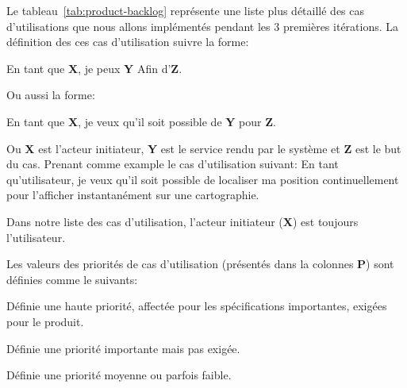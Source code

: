

Le tableau~\ref{tab:product-backlog} représente une liste plus détaillé des cas
d'utilisations que nous allons implémentés pendant les 3 premières itérations.
La définition des ces cas d'utilisation suivre la forme:

\begin{displayquote}
    En tant que \textbf{X}, je peux \textbf{Y} Afin d'\textbf{Z}.
\end{displayquote}

Ou aussi la forme:

\begin{displayquote}
    En tant que \textbf{X}, je veux qu'il soit possible de \textbf{Y} pour
    \textbf{Z}.
\end{displayquote}

Ou \textbf{X} est l'acteur initiateur, \textbf{Y} est le service rendu par le
système et \textbf{Z} est le but du cas. Prenant comme example le cas
d'utilisation suivant: En tant qu'utilisateur, je veux qu'il soit possible de
localiser ma position continuellement pour l'afficher instantanément sur une
cartographie.

Dans notre liste des cas d'utilisation, l'acteur initiateur (\textbf{X}) est
toujours l'utilisateur.

Les valeurs des priorités de cas d'utilisation (présentés dans la colonnes
\textbf{P}) sont définies comme le suivants:

\begin{description}[align=right,labelwidth=1cm]
    \item [1:] Définie une haute priorité, affectée pour les spécifications
        importantes, exigées pour le produit.
    \item [2:] Définie une priorité importante mais pas exigée.
    \item [3:] Définie une priorité moyenne ou parfois faible.
\end{description}

